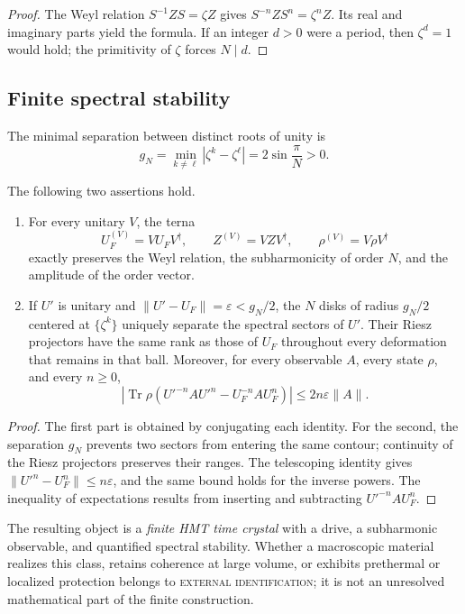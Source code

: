 \begin{proof}
The Weyl relation \(S^{-1} Z S=\zeta Z\) gives
\(S^{-n} Z S^n=\zeta^n Z\). Its real and imaginary parts yield the
formula. If an integer \(d>0\) were a period, then
\(\zeta^d=1\) would hold; the primitivity of \(\zeta\) forces \(N\mid d\).
\end{proof}

\subsection{Finite spectral stability}

The minimal separation between distinct roots of unity is
\[
 g_N=\min_{k\ne\ell}|\zeta^k-\zeta^\ell|
 =2\sin\frac{\pi}{N}>0.
\]

\begin{theorem}
\label{v:thm:hmtf2-estabilidad-cristal}
The following two assertions hold.

\begin{enumerate}
 \item For every unitary \(V\), the terna
 \[
  U_F^{(V)}=V U_F V^\dagger,\qquad
  Z^{(V)}=V Z V^\dagger,\qquad
  \rho^{(V)}=V\rho V^\dagger
 \]
 exactly preserves the Weyl relation, the subharmonicity of order \(N\), and
the amplitude of the order vector.
 \item If \(U'\) is unitary and
\(\|U'-U_F\|=\varepsilon<g_N/2\), the \(N\) disks of radius
\(g_N/2\) centered at \(\{\zeta^k\}\) uniquely separate the spectral sectors of
\(U'\). Their Riesz projectors have the same rank as those of
\(U_F\) throughout every deformation that remains in that ball.
Moreover, for every observable \(A\), every state \(\rho\), and every \(n\geq0\),
 \[
 \left|
 \operatorname{Tr}\rho\left(U'^{-n}AU'^n-U_F^{-n}AU_F^n\right)
 \right|
 \leq 2n\varepsilon\|A\|.
 \]
\end{enumerate}
\end{theorem}

\begin{proof}
The first part is obtained by conjugating each identity. For the second, the separation \(g_N\) prevents two sectors from entering the same contour; continuity of the Riesz projectors preserves their ranges. The telescoping identity gives \(\|U'^n-U_F^n\|\leq n\varepsilon\), and the same bound holds for the inverse powers. The inequality of expectations results from inserting and subtracting \(U'^{-n}AU_F^n\).
\end{proof}

The resulting object is a \emph{finite HMT time crystal} with a drive,
a subharmonic observable, and quantified spectral stability. Whether a
macroscopic material realizes this class, retains coherence at large volume, or
exhibits prethermal or localized protection belongs to
\textsc{external identification}; it is not an unresolved mathematical part of the
finite construction.


